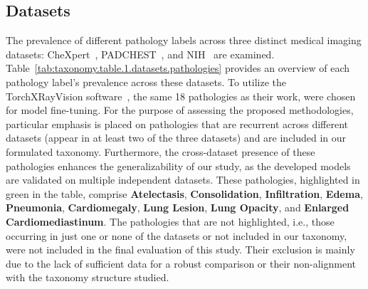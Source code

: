 \documentclass[review,1p,times,numbers]{elsarticle}
\begin{document}
\subsection{Datasets}
The prevalence of different pathology labels across three distinct medical imaging datasets: CheXpert~\cite{irvin_CheXpert_2019}, PADCHEST~\cite{bustos_Padchest_2020}, and NIH~\cite{wang_ChestXRay8_2017} are examined. Table~\ref{tab:taxonomy.table.1.datasets.pathologies} provides an overview of each pathology label's prevalence across these datasets. To utilize the TorchXRayVision software~\cite{cohen_TorchXRayVision_2022}, the same 18 pathologies as their work, were chosen for model fine-tuning. For the purpose of assessing the proposed methodologies, particular emphasis is placed on pathologies that are recurrent across different datasets (appear in at least two of the three datasets) and are included in our formulated taxonomy. Furthermore, the cross-dataset presence of these pathologies enhances the generalizability of our study, as the developed models are validated on multiple independent datasets. These pathologies, highlighted in \colorbox{mygreen}{green} in the table, comprise \textbf{Atelectasis}, \textbf{Consolidation}, \textbf{Infiltration}, \textbf{Edema}, \textbf{Pneumonia}, \textbf{Cardiomegaly}, \textbf{Lung Lesion}, \textbf{Lung Opacity}, and \textbf{Enlarged Cardiomediastinum}. The pathologies that are not highlighted, i.e., those occurring in just one or none of the datasets or not included in our taxonomy, were not included in the final evaluation of this study. Their exclusion is mainly due to the lack of sufficient data for a robust comparison or their non-alignment with the taxonomy structure studied.
\end{document}
